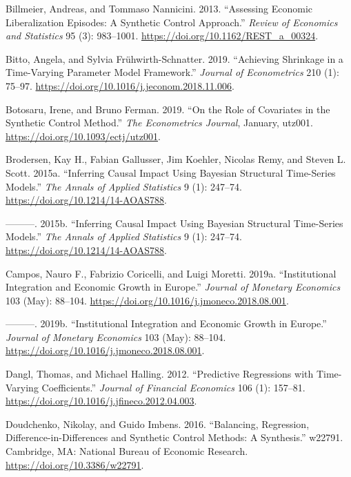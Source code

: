\documentclass[
]{article}
\begin{document}
\leavevmode\hypertarget{ref-billmeier_assessing_2013}{}%
Billmeier, Andreas, and Tommaso Nannicini. 2013. ``Assessing Economic
Liberalization Episodes: A Synthetic Control Approach.'' \emph{Review of
Economics and Statistics} 95 (3): 983--1001.
\url{https://doi.org/10.1162/REST_a_00324}.

\leavevmode\hypertarget{ref-bitto_achieving_2019}{}%
Bitto, Angela, and Sylvia Frühwirth-Schnatter. 2019. ``Achieving
Shrinkage in a Time-Varying Parameter Model Framework.'' \emph{Journal
of Econometrics} 210 (1): 75--97.
\url{https://doi.org/10.1016/j.jeconom.2018.11.006}.

\leavevmode\hypertarget{ref-botosaru_role_2019}{}%
Botosaru, Irene, and Bruno Ferman. 2019. ``On the Role of Covariates in
the Synthetic Control Method.'' \emph{The Econometrics Journal},
January, utz001. \url{https://doi.org/10.1093/ectj/utz001}.

\leavevmode\hypertarget{ref-brodersen_inferring_2015}{}%
Brodersen, Kay H., Fabian Gallusser, Jim Koehler, Nicolas Remy, and
Steven L. Scott. 2015a. ``Inferring Causal Impact Using Bayesian
Structural Time-Series Models.'' \emph{The Annals of Applied Statistics}
9 (1): 247--74. \url{https://doi.org/10.1214/14-AOAS788}.

\leavevmode\hypertarget{ref-brodersen_inferring_2015-1}{}%
---------. 2015b. ``Inferring Causal Impact Using Bayesian Structural
Time-Series Models.'' \emph{The Annals of Applied Statistics} 9 (1):
247--74. \url{https://doi.org/10.1214/14-AOAS788}.

\leavevmode\hypertarget{ref-campos_institutional_2019}{}%
Campos, Nauro F., Fabrizio Coricelli, and Luigi Moretti. 2019a.
``Institutional Integration and Economic Growth in Europe.''
\emph{Journal of Monetary Economics} 103 (May): 88--104.
\url{https://doi.org/10.1016/j.jmoneco.2018.08.001}.

\leavevmode\hypertarget{ref-campos_institutional_2019-1}{}%
---------. 2019b. ``Institutional Integration and Economic Growth in
Europe.'' \emph{Journal of Monetary Economics} 103 (May): 88--104.
\url{https://doi.org/10.1016/j.jmoneco.2018.08.001}.

\leavevmode\hypertarget{ref-dangl_predictive_2012}{}%
Dangl, Thomas, and Michael Halling. 2012. ``Predictive Regressions with
Time-Varying Coefficients.'' \emph{Journal of Financial Economics} 106
(1): 157--81. \url{https://doi.org/10.1016/j.jfineco.2012.04.003}.

\leavevmode\hypertarget{ref-doudchenko_balancing_2016}{}%
Doudchenko, Nikolay, and Guido Imbens. 2016. ``Balancing, Regression,
Difference-in-Differences and Synthetic Control Methods: A Synthesis.''
w22791. Cambridge, MA: National Bureau of Economic Research.
\url{https://doi.org/10.3386/w22791}.
\end{document}
